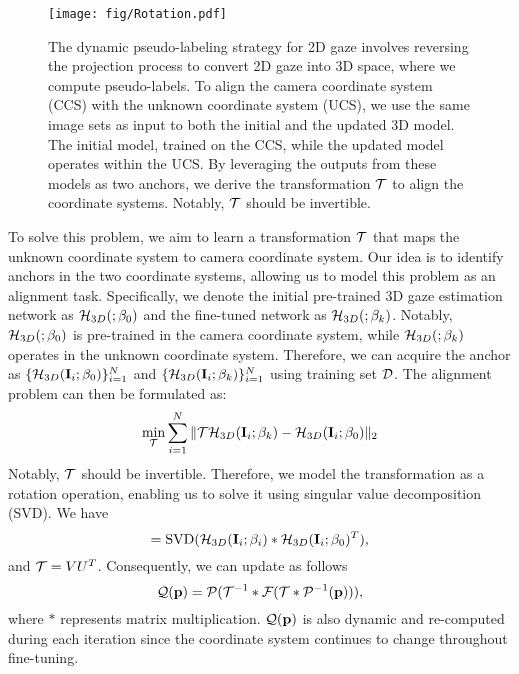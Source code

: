 \begin{figure}[t]
	\begin{center}
		\texttt{[image: fig/Rotation.pdf]}	
	\end{center}
   \vspace{-3mm}
	\caption{
    The dynamic pseudo-labeling strategy for 2D gaze involves reversing the projection process to convert 2D gaze into 3D space, where we compute pseudo-labels.
    To align the camera coordinate system (CCS) with the unknown coordinate system (UCS), we use the same image sets as input to both the initial and the updated 3D model. The initial model, trained on the CCS, while the updated model operates within the UCS. By leveraging the outputs from these models as two anchors, we derive the transformation $\mathcal{T}$ to align the coordinate systems. Notably, $\mathcal{T}$ should be invertible. \vspace{-6mm}}
	\label{fig:calibration}
\end{figure}

To solve this problem, we aim to learn a transformation $\mathcal{T}$ that maps the unknown coordinate system to camera coordinate system.
Our idea is to identify anchors in the two coordinate systems, allowing us to model this problem as an alignment task.
Specifically, we denote the initial pre-trained 3D gaze estimation network as $\mathcal{H}_{3D}(;\beta_0)$ and the fine-tuned network as $\mathcal{H}_{3D}(;\beta_k)$.
Notably, $\mathcal{H}_{3D}(;\beta_0)$ is pre-trained in the camera coordinate system, while $\mathcal{H}_{3D}(;\beta_k)$ operates in the unknown coordinate system. Therefore, we can acquire the anchor as $\{\mathcal{H}_{3D}(\mathbf{I}_i;\beta_0)\}_{i=1}^N$ and $\{\mathcal{H}_{3D}(\mathbf{I}_i;\beta_k)\}_{i=1}^N$ using training set $\mathcal{D}$. The alignment problem can then be formulated as:
\begin{equation}
    \min_{\mathcal{T}} \sum_{i=1}^N \|\mathcal{T}\mathcal{H}_{3D}(\mathbf{I}_i;\beta_k) - \mathcal{H}_{3D}(\mathbf{I}_i;\beta_0)\|_2
\end{equation}
Notably, $\mathcal{T}$ should be invertible. Therefore, we model the transformation as a rotation operation, enabling us to solve it using singular value decomposition (SVD). We have 
\begin{equation}
    [U, S, V] = \mathrm{SVD}(\cH_{3D}(\bI_i;\beta_i)*\cH_{3D}(\bI_i;\beta_0)^T),
\end{equation}
and $\mathcal{T} = VU^T$. Consequently, we can update  as follows
\begin{equation}
    \mathcal{Q}(\mathbf{p}) = \mathcal{P}(\mathcal{T}^{-1}*\mathcal{F}(\mathcal{T}*\mathcal{P}^{-1}(\mathbf{p}))),
    \label{equ:newflip}
\end{equation}
\noindent where $*$ represents matrix multiplication.
$\mathcal{Q}(\mathbf{p})$ is also dynamic and re-computed during each iteration since the coordinate system continues to change throughout fine-tuning.

